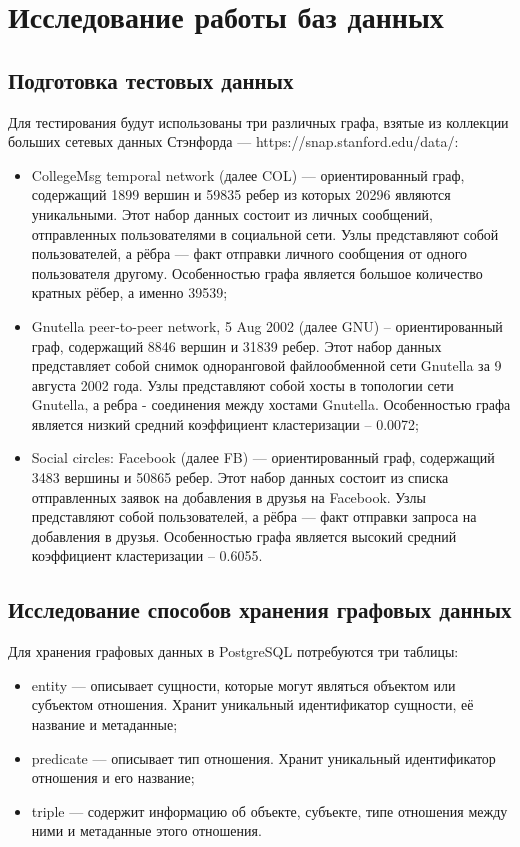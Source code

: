 \chapter{Исследование работы баз данных}


\section{Подготовка тестовых данных}

Для тестирования будут использованы три различных графа, взятые из коллекции больших сетевых данных Стэнфорда — https://snap.stanford.edu/data/:

\begin{itemize}
    \item CollegeMsg temporal network (далее COL) — ориентированный граф, содержащий 1899 вершин и 59835 ребер из которых 20296 являются уникальными. Этот набор данных состоит из личных сообщений, отправленных пользователями в социальной сети. Узлы представляют собой пользователей, а рёбра — факт отправки личного сообщения от одного пользователя другому. Особенностью графа является большое количество кратных рёбер, а именно 39539;
    \item Gnutella peer-to-peer network, 5 Aug 2002 (далее GNU) – ориентированный граф, содержащий 8846 вершин и 31839 ребер. Этот набор данных представляет собой снимок одноранговой файлообменной сети Gnutella за 9 августа 2002 года. Узлы представляют собой хосты в топологии сети Gnutella, а ребра - соединения между хостами Gnutella. Особенностью графа является низкий средний коэффициент кластеризации – 0.0072;
    \item Social circles: Facebook (далее FB) — ориентированный граф, содержащий 3483 вершины и 50865 ребер. Этот набор данных состоит из списка отправленных заявок на добавления в друзья на Facebook. Узлы представляют собой пользователей, а рёбра — факт отправки запроса на добавления в друзья. Особенностью графа является высокий средний коэффициент кластеризации – 0.6055.
\end{itemize}


\section{Исследование способов хранения графовых данных}

Для хранения графовых данных в PostgreSQL потребуются три таблицы:

\begin{itemize}
    \item entity — описывает сущности, которые могут являться объектом или субъектом отношения. Хранит уникальный идентификатор сущности, её название и метаданные;
    \item predicate — описывает тип отношения. Хранит уникальный идентификатор отношения и его название;
    \item triple — содержит информацию об объекте, субъекте, типе отношения между ними и метаданные этого отношения.
\end{itemize}

